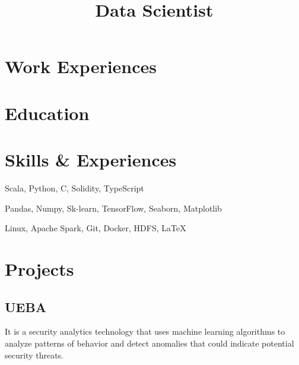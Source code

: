 \documentclass[10pt,a4paper]{moderncv}
\title{Data Scientist}
\begin{document}
\maketitle

\vspace{-5mm}

\section{Work Experiences}



\section{Education}


\section{Skills \& Experiences}
{Scala, Python, C, Solidity, TypeScript} {}{}{}{}

{Pandas, Numpy, Sk-learn, TensorFlow, Seaborn, Matplotlib} {}{}{}{}

{ Linux, Apache Spark, Git, Docker, HDFS, \LaTeX} {}{}{}{}



\section{Projects}
\cventry{}{} {}{}{}{}

\subsection{UEBA}
\cventry{}{} {}{}{}
{It is a security analytics technology that uses machine learning algorithms to analyze patterns of behavior and detect anomalies that could indicate potential security threats.}
\cventry{}{} {}{}{}{}
\end{document}
